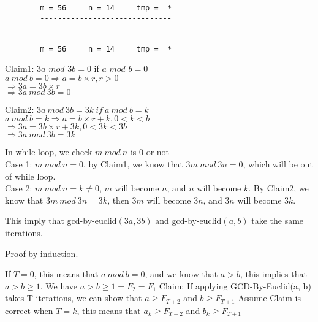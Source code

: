 \documentclass[11pt]{homework}
\begin{document}
    \begin{arabicpartsdsa}
    \item

        \begin{verbatim}
        m = 56     n = 14     tmp =  *
        ------------------------------

        ------------------------------
        m = 56     n = 14     tmp =  *
        \end{verbatim}

    \item

        Claim1: \(3a\) \(mod\) \(3b = 0\) if \(a\) \(mod\) \(b = 0\)\\
        \(a\ mod\ b = 0 \Rightarrow a = b \times r, r > 0\)\\
        \(\Rightarrow 3a = 3b \times r \)\\
        \(\Rightarrow3a\ mod\ 3b = 0 \)

        Claim2: \(3a\ mod\ 3b = 3k\ if\ a\ mod\ b = k\)\\
        \(a\ mod\ b = k \Rightarrow a = b \times r + k, 0 < k < b \)\\
        \(\Rightarrow 3a = 3b \times r + 3k, 0 < 3k < 3b\)\\
        \(\Rightarrow 3a\ mod\ 3b = 3k\)

        In while loop, we check \(m\ mod\ n\) is 0 or not\\
        Case 1: \(m\ mod\ n = 0\), by Claim1, we know that \(3m\ mod\ 3n = 0\), which will be out of while loop.\\
        Case 2: \(m\ mod\ n = k \neq 0\), \(m\) will become \(n\), and \(n\) will become \(k\). By Claim2, we know that \(3m\ mod\ 3n = 3k\), 
        then \(3m\) will become \(3n\), and \(3n\) will become \(3k\).

        This imply that gcd-by-euclid\((3a, 3b)\) and gcd-by-euclid\((a, b)\) take the same iterations.
    \item

        Proof by induction.
        \begin{induction}
            \basecase
            If \(T = 0\), this means that \(a\ mod\ b = 0\), and we know that \(a > b\), this implies
            that \(a > b \geq 1\). We have \(a > b \geq 1 = F_2 = F_1\)
            \indhyp
            Claim: If applying GCD-By-Euclid(a, b) takes T iterations, we can show that
            \(a \geq F_{T+2}\) and \(b \geq F_{T+1}\)
            \indstep
            Assume Claim is correct when \(T = k\), this means that \(a_k \geq F_{T+2}\) and \(b_k \geq F_{T+1}\)


\end{induction}
\end{arabicpartsdsa}
\end{document}
